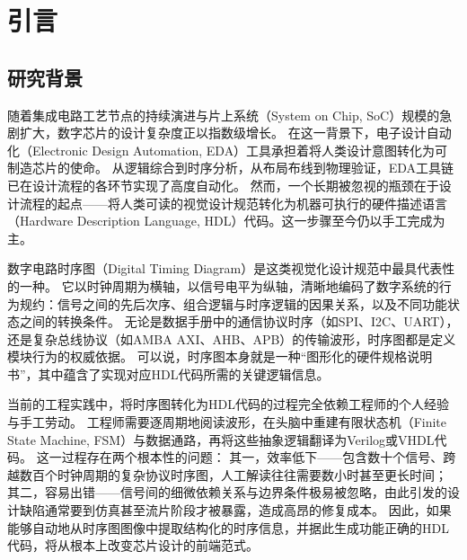 
\chapter{引言}

\section{研究背景}

随着集成电路工艺节点的持续演进与片上系统（System on Chip, SoC）规模的急剧扩大，数字芯片的设计复杂度正以指数级增长。
在这一背景下，电子设计自动化（Electronic Design Automation, EDA）工具承担着将人类设计意图转化为可制造芯片的使命。
从逻辑综合到时序分析，从布局布线到物理验证，EDA工具链已在设计流程的各环节实现了高度自动化。
然而，一个长期被忽视的瓶颈在于设计流程的起点——将人类可读的视觉设计规范转化为机器可执行的硬件描述语言（Hardware Description Language, HDL）代码。这一步骤至今仍以手工完成为主。

数字电路时序图（Digital Timing Diagram）是这类视觉化设计规范中最具代表性的一种。
它以时钟周期为横轴，以信号电平为纵轴，清晰地编码了数字系统的行为规约：信号之间的先后次序、组合逻辑与时序逻辑的因果关系，以及不同功能状态之间的转换条件。
无论是数据手册中的通信协议时序（如SPI、I2C、UART），还是复杂总线协议（如AMBA AXI、AHB、APB）的传输波形，时序图都是定义模块行为的权威依据。
可以说，时序图本身就是一种“图形化的硬件规格说明书”，其中蕴含了实现对应HDL代码所需的关键逻辑信息。

当前的工程实践中，将时序图转化为HDL代码的过程完全依赖工程师的个人经验与手工劳动。
工程师需要逐周期地阅读波形，在头脑中重建有限状态机（Finite State Machine, FSM）与数据通路，再将这些抽象逻辑翻译为Verilog或VHDL代码。
这一过程存在两个根本性的问题：
其一，效率低下——包含数十个信号、跨越数百个时钟周期的复杂协议时序图，人工解读往往需要数小时甚至更长时间；
其二，容易出错——信号间的细微依赖关系与边界条件极易被忽略，由此引发的设计缺陷通常要到仿真甚至流片阶段才被暴露，造成高昂的修复成本。
因此，如果能够自动地从时序图图像中提取结构化的时序信息，并据此生成功能正确的HDL代码，将从根本上改变芯片设计的前端范式。

